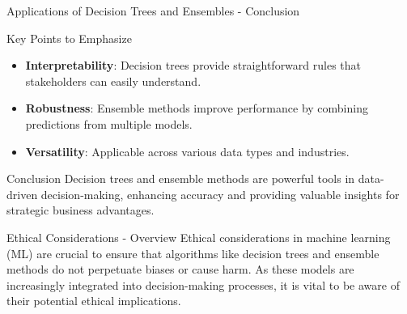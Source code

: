 \documentclass[aspectratio=169]{beamer}
\begin{document}
\begin{frame}[fragile]{Applications of Decision Trees and Ensembles - Conclusion}
    \begin{block}{Key Points to Emphasize}
        \begin{itemize}
            \item \textbf{Interpretability}: Decision trees provide straightforward rules that stakeholders can easily understand.
            \item \textbf{Robustness}: Ensemble methods improve performance by combining predictions from multiple models.
            \item \textbf{Versatility}: Applicable across various data types and industries.
        \end{itemize}
    \end{block}
    
    \begin{block}{Conclusion}
        Decision trees and ensemble methods are powerful tools in data-driven decision-making, enhancing accuracy and providing valuable insights for strategic business advantages.
    \end{block}
\end{frame}

\begin{frame}[fragile]{Ethical Considerations - Overview}
    Ethical considerations in machine learning (ML) are crucial to ensure that algorithms like decision trees and ensemble methods do not perpetuate biases or cause harm. As these models are increasingly integrated into decision-making processes, it is vital to be aware of their potential ethical implications.
\end{frame}
\end{document}
